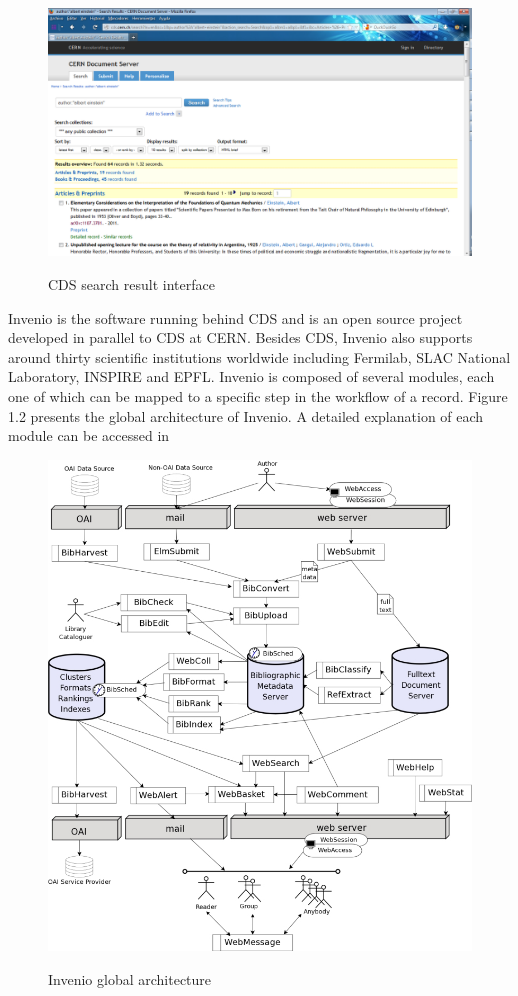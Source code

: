 \begin{figure}
\centering
\includegraphics[height=7 cm]{figures/cds_screenshot.png}
\label{cds_screenshot}
\caption{CDS search result interface}
\end{figure}
 


Invenio\cite{invenio} is the software running behind CDS and is an open source project developed in parallel to CDS at CERN. Besides CDS, Invenio also supports around thirty scientific institutions worldwide including Fermilab, SLAC National Laboratory, INSPIRE and EPFL. 
Invenio is composed of several modules, each one of which can be mapped to a specific step in the workflow of a record. Figure 1.2 presents the global architecture of Invenio. A detailed explanation of each module can be accessed in \cite{invenio_modules} 

\begin{figure}
\centering
\includegraphics[height=15 cm]{figures/invenio.jpeg}
\label{invenio_architecture}
\caption{Invenio global architecture}
\end{figure}


